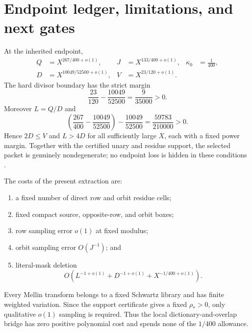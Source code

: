 \section{Endpoint ledger, limitations, and next gates}
\label{sec:tpc53-endpoint}

At the inherited endpoint,
\begin{equation}
 \begin{aligned}
 Q&=X^{267/400+o(1)},&
 J&=X^{133/400+o(1)},&
 \kappa_0&=\frac1{400},\\
 D&=X^{10049/52500+o(1)},&
 V&=X^{23/120+o(1)}.
 \end{aligned}
 \label{eq:tpc53-endpoint-scales}
\end{equation}
The hard divisor boundary has the strict margin
\begin{equation}
 \frac{23}{120}-\frac{10049}{52500}
 =\frac9{35000}>0.
 \label{eq:tpc53-hard-cutoff-margin}
\end{equation}
Moreover \(L=Q/D\) and
\begin{equation}
 \left(\frac{267}{400}-\frac{10049}{52500}\right)
 -\frac{10049}{52500}
 =\frac{59783}{210000}>0.
 \label{eq:tpc53-L-over-D-margin}
\end{equation}
Hence \(2D\le V\) and \(L>4D\) for all sufficiently large \(X\), each
with a fixed power margin.  Together with the certified unary and
residue support, the selected packet is genuinely nondegenerate; no
endpoint loss is hidden in these conditions \citep{WangTPC50}.

The costs of the present extraction are:
\begin{enumerate}[label=\textup{(E\arabic*)},leftmargin=3em]
 \item a fixed number of direct row and orbit residue cells;
 \item fixed compact source, opposite-row, and orbit boxes;
 \item row sampling error \(o(1)\) at fixed modulus;
 \item orbit sampling error \(O(J^{-1})\); and
 \item literal-mask deletion
 \[
 O\!\left(L^{-1+o(1)}+D^{-1+o(1)}
          +X^{-1/400+o(1)}\right).
 \]
\end{enumerate}
Every Mellin transform belongs to a fixed Schwartz library and has
finite weighted variation.  Since the support certificate gives a fixed
\(\rho_*>0\), only qualitative \(o(1)\) sampling is required.  Thus the
local dictionary-and-overlap bridge has zero positive polynomial cost
and spends none of the \(1/400\) allowance.

